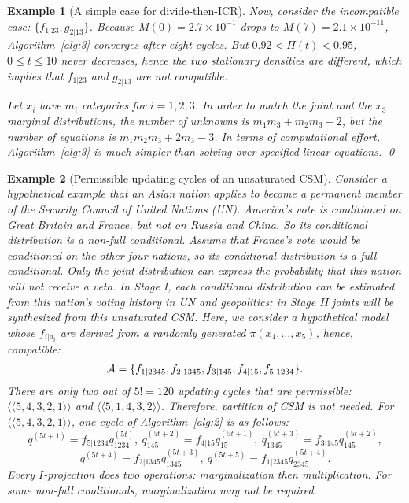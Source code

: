 \documentclass[12pt,a4paper]{article}
\newtheorem{example}{Example}
\begin{document}
\begin{example}[A simple case for divide-then-ICR]
Now, consider the incompatible case: $\{f_{1|23}, g_{2|13}\}$.  Because $M(0)=2.7\times 10^{-1}$ drops to $M(7)=2.1\times 10^{-11}$, Algorithm~\ref{alg:3} converges after eight cycles.
But $0.92 <\Pi(t)<0.95$, $0\le t\le 10$ never decreases, hence
the two stationary densities are different, which implies that $f_{1|23}$ and $g_{2|13}$
are not compatible.

Let $x_i$ have $m_i$ categories for $i=1,2,3$.  In order to match the joint and the $x_3$ marginal distributions, the number of unknowns is $m_1 m_3+ m_2 m_3-2$, but the number of equations is $m_1 m_2 m_3+ 2 m_3-3$.  In terms of computational effort, Algorithm~\ref{alg:3} is much simpler than solving over-specified linear equations.
\qed
\end{example}

\begin{example}[Permissible updating cycles of an unsaturated CSM]\label{ex:2}\rm
Consider a hypothetical example that an Asian nation applies to become a permanent member
of the Security Council of United Nations (UN). America's vote is conditioned
on Great Britain and France, but not on Russia and China. So its  conditional distribution
is a non-full conditional.  Assume that France's vote would be
conditioned on the other four nations, so its conditional distribution is a full conditional.
Only the joint distribution can express the  probability that this nation
will not receive a veto.  In {\sf Stage I}, each conditional distribution can be estimated from
this nation's voting history in UN and geopolitics; in {\sf Stage II}
 joints will be synthesized from this unsaturated CSM.
Here, we consider a hypothetical model  whose $f_{i|a_i}$ are derived from a
randomly generated $\pi(x_1,\ldots,x_5)$, hence, compatible:
\[{\cal A}=\{f_{1|2345},f_{2|1345},f_{3|145},f_{4|15},f_{5|1234}\}.\]
There are only two out of $5!=120$ updating cycles that are permissible:
$\langle \langle 5,4,3,2,1\rangle \rangle$ and $\langle \langle 5,1,4,3,2\rangle \rangle$.
Therefore, partition of CSM is not needed.
For $\langle \langle 5,4,3,2,1\rangle \rangle$, one cycle of Algorithm~\ref{alg:2} is as follows:
\[q^{(5t+1)}=f_{5|1234}q_{1234}^{(5t)},\ q_{145}^{(5t+2)}=f_{4|15}q_{15}^{(5t+1)},\
q_{1345}^{(5t+3)}=f_{3|145}q_{145}^{(5t+2)},\]
\[q^{(5t+4)}=f_{2|1345}q_{1345}^{(5t+3)},\ q^{(5t+5)}=f_{1|2345}q_{2345}^{(5t+4)}.\]
Every $I$-projection does two operations: marginalization then multiplication.
For some non-full conditionals, marginalization may not be required.

\end{example}
\end{document}
